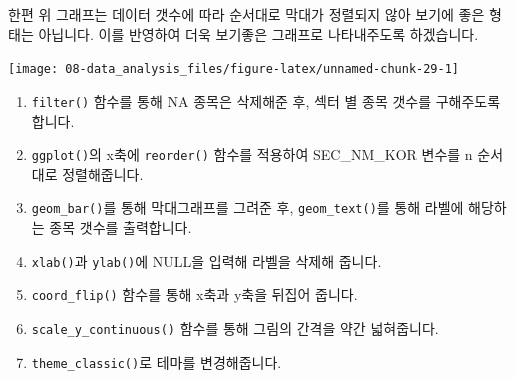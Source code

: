 \documentclass[12pt,]{book}
\newenvironment{Shaded}{\begin{snugshade}}{\end{snugshade}}
\newcommand{\DataTypeTok}[1]{\textcolor[rgb]{0.13,0.29,0.53}{#1}}
\newcommand{\DecValTok}[1]{\textcolor[rgb]{0.00,0.00,0.81}{#1}}
\newcommand{\FloatTok}[1]{\textcolor[rgb]{0.00,0.00,0.81}{#1}}
\newcommand{\KeywordTok}[1]{\textcolor[rgb]{0.13,0.29,0.53}{\textbf{#1}}}
\newcommand{\NormalTok}[1]{#1}
\newcommand{\OperatorTok}[1]{\textcolor[rgb]{0.81,0.36,0.00}{\textbf{#1}}}
\newcommand{\OtherTok}[1]{\textcolor[rgb]{0.56,0.35,0.01}{#1}}
\newcommand{\StringTok}[1]{\textcolor[rgb]{0.31,0.60,0.02}{#1}}
\providecommand{\tightlist}{%
  \setlength{\itemsep}{0pt}\setlength{\parskip}{0pt}}
\begin{document}
한편 위 그래프는 데이터 갯수에 따라 순서대로 막대가 정렬되지 않아 보기에 좋은 형태는 아닙니다. 이를 반영하여 더욱 보기좋은 그래프로 나타내주도록 하겠습니다.

\begin{Shaded}
\end{Shaded}

\begin{center}\texttt{[image: 08-data\_analysis\_files/figure-latex/unnamed-chunk-29-1]} \end{center}

\begin{enumerate}
\def\labelenumi{\arabic{enumi}.}
\tightlist
\item
  \texttt{filter()} 함수를 통해 NA 종목은 삭제해준 후, 섹터 별 종목 갯수를 구해주도록 합니다.
\item
  \texttt{ggplot()}의 x축에 \texttt{reorder()} 함수를 적용하여 SEC\_NM\_KOR 변수를 n 순서대로 정렬해줍니다.
\item
  \texttt{geom\_bar()}를 통해 막대그래프를 그려준 후, \texttt{geom\_text()}를 통해 라벨에 해당하는 종목 갯수를 출력합니다.
\item
  \texttt{xlab()}과 \texttt{ylab()}에 NULL을 입력해 라벨을 삭제해 줍니다.
\item
  \texttt{coord\_flip()} 함수를 통해 x축과 y축을 뒤집어 줍니다.
\item
  \texttt{scale\_y\_continuous()} 함수를 통해 그림의 간격을 약간 넓혀줍니다.
\item
  \texttt{theme\_classic()}로 테마를 변경해줍니다.
\end{enumerate}
\end{document}
